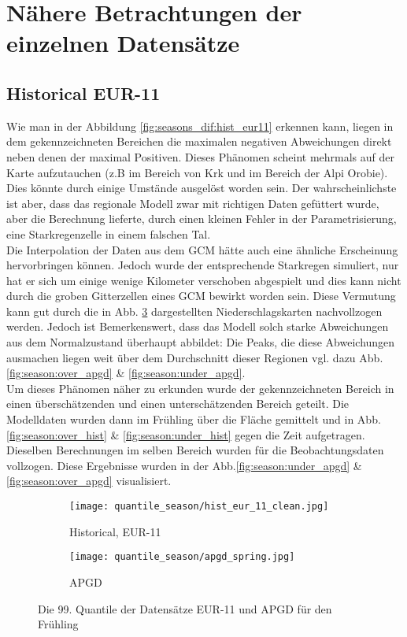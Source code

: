 \section{Nähere Betrachtungen der einzelnen Datensätze}
\subsection{Historical EUR-11} \label{subsec:hist_eur11}
Wie man in der Abbildung \ref{fig:seasons_dif:hist_eur11} erkennen kann, liegen in dem gekennzeichneten Bereichen die maximalen negativen Abweichungen direkt neben denen der maximal Positiven. Dieses Phänomen scheint mehrmals auf der Karte aufzutauchen (z.B im Bereich von Krk und im Bereich der Alpi Orobie). Dies könnte durch einige Umstände ausgelöst worden sein. Der wahrscheinlichste ist aber, dass das regionale Modell zwar mit richtigen Daten gefüttert wurde, aber die Berechnung lieferte, durch einen kleinen Fehler in der Parametrisierung, eine Starkregenzelle in einem falschen Tal.\\
Die Interpolation der Daten aus dem GCM hätte auch eine ähnliche Erscheinung hervorbringen können. Jedoch wurde der entsprechende Starkregen simuliert, nur hat er sich um einige wenige Kilometer verschoben abgespielt und dies kann nicht durch die groben Gitterzellen eines GCM bewirkt worden sein. Diese Vermutung kann gut durch die in Abb. \ref{fig:seasons_hist} dargestellten Niederschlagskarten nachvollzogen werden. Jedoch ist Bemerkenswert, dass das Modell solch starke Abweichungen aus dem Normalzustand überhaupt abbildet: Die Peaks, die diese Abweichungen ausmachen liegen weit über dem Durchschnitt dieser Regionen vgl. dazu Abb.\ref{fig:season:over_apgd} \& \ref{fig:season:under_apgd}.\\
Um dieses Phänomen näher zu erkunden wurde der gekennzeichneten Bereich in einen überschätzenden und einen unterschätzenden Bereich geteilt. Die Modelldaten wurden dann im Frühling über die Fläche gemittelt und in Abb.\ref{fig:season:over_hist} \& \ref{fig:season:under_hist} gegen die Zeit aufgetragen. Dieselben Berechnungen im selben Bereich wurden für die Beobachtungsdaten vollzogen. Diese Ergebnisse wurden in der Abb.\ref{fig:season:under_apgd} \& \ref{fig:season:over_apgd} visualisiert.\\
\begin{figure}[h]
	\begin{subfigure}{0.49\textwidth}
		\texttt{[image: quantile\_season/hist\_eur\_11\_clean.jpg]}
		\caption{Historical, EUR-11}
		\label{fig:seasons_hist:hist}
	\end{subfigure}
	\begin{subfigure}{0.49\textwidth}
		\texttt{[image: quantile\_season/apgd\_spring.jpg]}
		\caption{APGD}
		\label{fig:seasons_hist:apgd}
	\end{subfigure}
	\caption{Die 99. Quantile der Datensätze EUR-11 und APGD für den Frühling}
	\label{fig:seasons_hist}
\end{figure}
